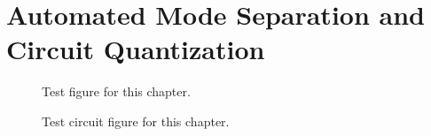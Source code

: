 
\chapter{Automated Mode Separation and Circuit Quantization}\label{chp:circuit_quantization}
\begin{figure}[htbp]
    \centering
    
    \caption{Test figure for this chapter.}
\end{figure}
\begin{figure}[htbp]
    \centering
    
    \caption{Test circuit figure for this chapter.}
\end{figure}

